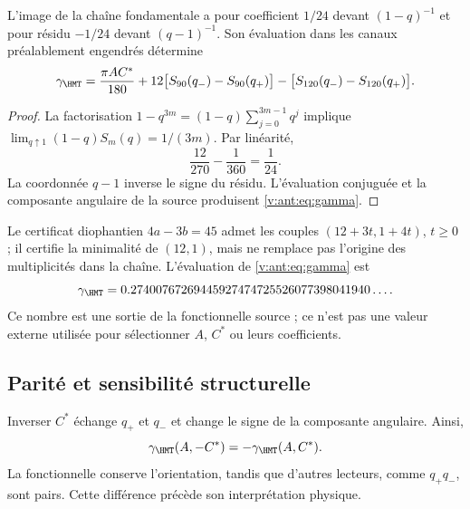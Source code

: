 \begin{theorem}
L'image de la chaîne fondamentale a pour coefficient $1/24$
devant $(1-q)^{-1}$ et pour résidu $-1/24$ devant $(q-1)^{-1}$.
Son évaluation dans les canaux préalablement engendrés détermine
\begin{equation}
\gamma_{\HMT}=
\frac{\pi AC^*}{180}
+12\bigl[S_{90}(q_-)-S_{90}(q_+)\bigr]
-\bigl[S_{120}(q_-)-S_{120}(q_+)\bigr].
\label{v:ant:eq:gamma}
\end{equation}
\end{theorem}
\begin{proof}
La factorisation $1-q^{3m}=(1-q)\sum_{j=0}^{3m-1}q^j$ implique
$\lim_{q\uparrow1}(1-q)S_m(q)=1/(3m)$. Par linéarité,
\[
\frac{12}{270}-\frac1{360}=\frac1{24}.
\]
La coordonnée $q-1$ inverse le signe du résidu.
L'évaluation conjuguée et la composante angulaire de la source
produisent \eqref{v:ant:eq:gamma}.
\end{proof}

Le certificat diophantien $4a-3b=45$ admet les couples
$(12+3t,1+4t)$, $t\ge0$ ; il certifie la minimalité de $(12,1)$,
mais ne remplace pas l'origine des multiplicités dans la chaîne.
L'évaluation de \eqref{v:ant:eq:gamma} est
\[
\gamma_{\HMT}
=0.27400767269445927474725526077398041940\ldots.
\]
Ce nombre est une sortie de la fonctionnelle source ; ce n'est pas une valeur externe
utilisée pour sélectionner $A$, $C^*$ ou leurs coefficients.

\subsection{Parité et sensibilité structurelle}
Inverser $C^*$ échange $q_+$ et $q_-$ et change le signe
de la composante angulaire. Ainsi,
\[
\gamma_{\HMT}(A,-C^*)=-\gamma_{\HMT}(A,C^*).
\]
La fonctionnelle conserve l'orientation, tandis que d'autres lecteurs,
comme $q_+q_-$, sont pairs. Cette différence précède son interprétation physique.
